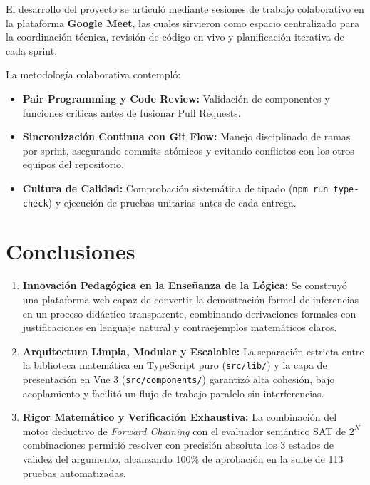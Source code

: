 \documentclass[11pt,a4paper]{article}
\begin{document}
El desarrollo del proyecto se articuló mediante sesiones de trabajo colaborativo en la plataforma \textbf{Google Meet}, las cuales sirvieron como espacio centralizado para la coordinación técnica, revisión de código en vivo y planificación iterativa de cada sprint.

La metodología colaborativa contempló:
\begin{itemize}[leftmargin=1.2cm]
    \item \textbf{Pair Programming y Code Review:} Validación de componentes y funciones críticas antes de fusionar Pull Requests.
    \item \textbf{Sincronización Continua con Git Flow:} Manejo disciplinado de ramas por sprint, asegurando commits atómicos y evitando conflictos con los otros equipos del repositorio.
    \item \textbf{Cultura de Calidad:} Comprobación sistemática de tipado (\texttt{npm run type-check}) y ejecución de pruebas unitarias antes de cada entrega.
\end{itemize}

\section{Conclusiones}

\begin{enumerate}[label=\textbf{\arabic*.}]
    \item \textbf{Innovación Pedagógica en la Enseñanza de la Lógica:} Se construyó una plataforma web capaz de convertir la demostración formal de inferencias en un proceso didáctico transparente, combinando derivaciones formales con justificaciones en lenguaje natural y contraejemplos matemáticos claros.
    \item \textbf{Arquitectura Limpia, Modular y Escalable:} La separación estricta entre la biblioteca matemática en TypeScript puro (\texttt{src/lib/}) y la capa de presentación en Vue 3 (\texttt{src/components/}) garantizó alta cohesión, bajo acoplamiento y facilitó un flujo de trabajo paralelo sin interferencias.
    \item \textbf{Rigor Matemático y Verificación Exhaustiva:} La combinación del motor deductivo de \textit{Forward Chaining} con el evaluador semántico SAT de $2^N$ combinaciones permitió resolver con precisión absoluta los 3 estados de validez del argumento, alcanzando 100\% de aprobación en la suite de 113 pruebas automatizadas.
\end{enumerate}
\end{document}
